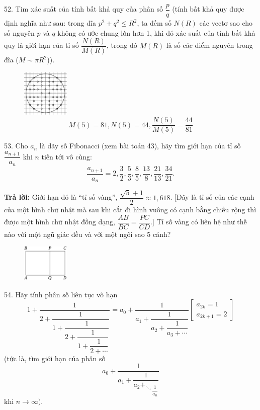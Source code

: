 \begin{problem}{52.}
	Tìm xác suất của tính bất khả quy của phân số $\dfrac{p}{q}$ (tính bất khả quy được định nghĩa như sau:  trong đĩa $p^2+q^2\leq R^2$, 
	ta đếm số $N(R)$ các vectơ sao cho số nguyên $p$ và $q$ không có ước chung lớn hơn 1, khi đó xác suất của tính bất khả quy là giới hạn
	của tỉ số $\dfrac{N(R)}{M(R)}$, trong đó $M(R)$ là số các điểm nguyên trong đĩa ($M\sim \pi R^2$)).
	\begin{figure}
	\includegraphics[width=0.2\textwidth]{taskbook-36}
	$$M(5)=81, N(5)=44, \dfrac{N(5)}{M(5)}=\dfrac{44}{81}$$
	\end{figure}
\end{problem}

\begin{problem}{53.}
	Cho $a_n$ là dãy số Fibonacci (xem bài toán 43), hãy tìm giới hạn của tỉ số $\dfrac{a_{n+1}}{a_n}$ khi $n$ tiến tới vô cùng:
	$$\dfrac{a_{n+1}}{a_n}=2, \dfrac{3}{2}, \dfrac{5}{3}, \dfrac{8}{5}, \dfrac{13}{8}, \dfrac{21}{13}, \dfrac{34}{21}.$$

	\textbf{Trả lời: } Giới hạn đó là \enquote{tỉ số vàng}, $\dfrac{\sqrt{5}+1}{2}\approx 1,618$. [Đây là tỉ số của các cạnh của một hình chữ nhật mà sau khi cắt đi hình vuông có cạnh bằng chiều rộng thì được một hình chữ nhật đồng dạng, $\dfrac{AB}{BC}=\dfrac{PC}{CD}$.] Tỉ số vàng có liên hệ như thế nào với một ngũ giác đều và với một ngôi sao 5 cánh?
	\begin{figure}
		\includegraphics[width=0.2\textwidth]{taskbook-37}
	\end{figure}
\end{problem}

\begin{problem}{54.}
	Hãy tính phân số liên tục vô hạn
	$$1+\dfrac{1}{2+\dfrac{1}{1+\dfrac{1}{2+\dfrac{1}{1+\dfrac{1}{2+\cdots}}}}}=
	a_0+\dfrac{1}{a_1+\dfrac{1}{a_2+\dfrac{1}{a_3+\cdots}}} \left[ \begin{matrix} a_{2k}=1\\
	a_{2k+1}=2
	\end{matrix}\right]$$
	(tức là, tìm giới hạn của phân số 
	$$a_0+\dfrac{1}{a_1+\dfrac{1}{{a_2+_{\ddots_+}}_{\dfrac{1}{a_n}}}}$$
	khi $n\rightarrow \infty)$.
\end{problem}

